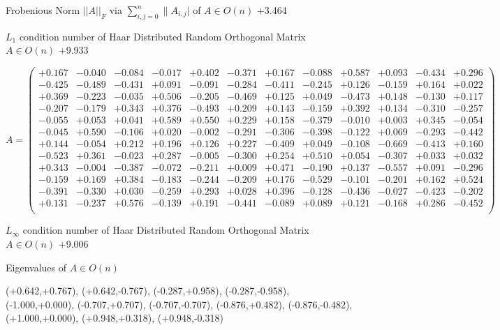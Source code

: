 \documentclass[9pt]{article}
\theoremstyle{plain}
\theoremstyle{definition}
\theoremstyle{remark}
\numberwithin{equation}{section}
\begin{document}
Frobenious Norm  $||A||_{\textit{F}}$ via $\sum\limits_{i,j =0}^{n} \|A_{i,j}|$   of  $A \in O(n)$  +3.464

$L_1$ condition number of Haar Distributed Random Orthogonal Matrix $A \in O(n)$ +9.933

$A = \left(
\begin{array}{
cccccccccccc}
+0.167 & -0.040 & -0.084 & -0.017 & +0.402 & -0.371 & +0.167 & -0.088 & +0.587 & +0.093 & -0.434 & +0.296 \\
-0.425 & -0.489 & -0.431 & +0.091 & -0.091 & -0.284 & -0.411 & -0.245 & +0.126 & -0.159 & +0.164 & +0.022 \\
+0.369 & -0.223 & -0.035 & +0.506 & -0.205 & -0.469 & +0.125 & +0.049 & -0.473 & +0.148 & -0.130 & +0.117 \\
-0.207 & -0.179 & +0.343 & +0.376 & -0.493 & +0.209 & +0.143 & -0.159 & +0.392 & +0.134 & -0.310 & -0.257 \\
-0.055 & +0.053 & +0.041 & +0.589 & +0.550 & +0.229 & +0.158 & -0.379 & -0.010 & +0.003 & +0.345 & -0.054 \\
-0.045 & +0.590 & -0.106 & +0.020 & -0.002 & -0.291 & -0.306 & -0.398 & -0.122 & +0.069 & -0.293 & -0.442 \\
+0.144 & -0.054 & +0.212 & +0.196 & +0.126 & +0.227 & -0.409 & +0.049 & -0.108 & -0.669 & -0.413 & +0.160 \\
-0.523 & +0.361 & -0.023 & +0.287 & -0.005 & -0.300 & +0.254 & +0.510 & +0.054 & -0.307 & +0.033 & +0.032 \\
+0.343 & -0.004 & -0.387 & -0.072 & -0.211 & +0.009 & +0.471 & -0.190 & +0.137 & -0.557 & +0.091 & -0.296 \\
-0.159 & +0.169 & +0.384 & -0.183 & -0.244 & -0.209 & +0.176 & -0.529 & -0.101 & -0.201 & +0.162 & +0.524 \\
-0.391 & -0.330 & +0.030 & -0.259 & +0.293 & +0.028 & +0.396 & -0.128 & -0.436 & -0.027 & -0.423 & -0.202 \\
+0.131 & -0.237 & +0.576 & -0.139 & +0.191 & -0.441 & -0.089 & +0.089 & +0.121 & -0.168 & +0.286 & -0.452 \\
\end{array}
\right)$ \newline 

$L_{\infty}$ condition number of Haar Distributed Random Orthogonal Matrix $A \in O(n)$ +9.006

Eigenvalues of $A \in O(n)$

(+0.642,+0.767), (+0.642,-0.767), (-0.287,+0.958), (-0.287,-0.958), (-1.000,+0.000), (-0.707,+0.707), (-0.707,-0.707), (-0.876,+0.482), (-0.876,-0.482), (+1.000,+0.000), (+0.948,+0.318), (+0.948,-0.318)
\end{document}
